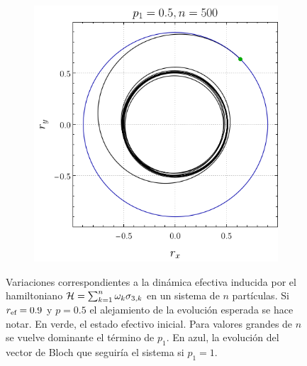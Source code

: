\begin{figure}[ht!]
\begin{subfigure}{0.5\textwidth}
      \includegraphics[width=0.9\linewidth]{chapter3/figures_separable/local_all_ran_p=0.5_r=0.9_n=500_a=-3_b=3.png}
    \end{subfigure}
    \caption{Variaciones correspondientes a la dinámica efectiva inducida por el hamiltoniano $\mathcal{H}=\sum_{k=1}^{n}\omega_{k}\sigma_{3,k}$ en un sistema de $n$ partículas. Si $r_{\text{ef}}=0.9$ y $p=0.5$ el alejamiento de la evolución esperada se hace notar. En verde, el estado efectivo inicial. Para valores grandes de $n$ se vuelve dominante el término de $p_{1}$. En azul, la evolución del vector de Bloch que seguiría el sistema si $p_{1}=1$. \label{fig:Oscilations13}}
\end{figure}

\newpage

\pagebreak